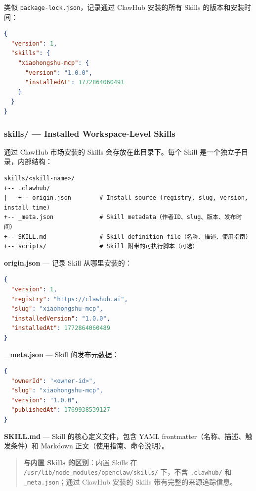 类似 \texttt{package-lock.json}，记录通过 ClawHub 安装的所有 Skills 的版本和安装时间：

\begin{lstlisting}[language=json]
{
  "version": 1,
  "skills": {
    "xiaohongshu-mcp": {
      "version": "1.0.0",
      "installedAt": 1772864060491
    }
  }
}
\end{lstlisting}

\subsubsection{skills/ --- Installed Workspace-Level Skills}


通过 ClawHub 市场安装的 Skills 会存放在此目录下。每个 Skill 是一个独立子目录，内部结构：

\begin{lstlisting}
skills/<skill-name>/
+-- .clawhub/
|   +-- origin.json        # Install source (registry, slug, version, install time)
+-- _meta.json             # Skill metadata（作者ID、slug、版本、发布时间）
+-- SKILL.md               # Skill definition file（名称、描述、使用指南）
+-- scripts/               # Skill 附带的可执行脚本（可选）
\end{lstlisting}

\textbf{origin.json} --- 记录 Skill 从哪里安装的：

\begin{lstlisting}[language=json]
{
  "version": 1,
  "registry": "https://clawhub.ai",
  "slug": "xiaohongshu-mcp",
  "installedVersion": "1.0.0",
  "installedAt": 1772864060489
}
\end{lstlisting}

\textbf{\_meta.json} --- Skill 的发布元数据：

\begin{lstlisting}[language=json]
{
  "ownerId": "<owner-id>",
  "slug": "xiaohongshu-mcp",
  "version": "1.0.0",
  "publishedAt": 1769938539127
}
\end{lstlisting}

\textbf{SKILL.md} --- Skill 的核心定义文件，包含 YAML frontmatter（名称、描述、触发条件）和 Markdown 正文（使用指南、命令说明）。

\begin{quote}
\textbf{与内置 Skills 的区别}：内置 Skills 在 \texttt{/usr/lib/node\_modules/openclaw/skills/} 下，不含 \texttt{.clawhub/} 和 \texttt{\_meta.json}；通过 ClawHub 安装的 Skills 带有完整的来源追踪信息。
\end{quote}

